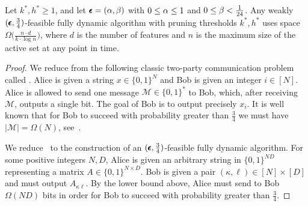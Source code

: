 \begin{theorem}\label{thm:lb}
Let $k^*, h^* \ge 1$, and let $\pmb{\epsilon}=(\alpha,\beta)$ with $0 \le \alpha \le 1$ and $0 \le \beta < \frac1{24}$. Any weakly $(\pmb{\epsilon},\frac34)$-feasible fully dynamic algorithm with pruning thresholds $k^*, h^*$ uses space $\Omega \big( \frac{n \cdot d} {k \cdot \log n} \big)$, where $d$ is the number of features and $n$ is the maximum size of the active set at any point in time. 
\end{theorem}

\begin{proof}
We reduce from the following classic two-party communication problem called \ind. %
%
Alice is given a string $x \in \{0,1\}^N$ and Bob is given an integer $i \in [N]$. Alice is allowed to send one message $\mathcal{M} \in \{0,1\}^*$ to Bob, which, after receiving $\mathcal M$, outputs a single bit. The goal of Bob is to output precisely $x_i$. It is well known that for Bob to succeed with probability greater than $\frac34$ we must have $|\mathcal{M}|=\Omega(N)$, see~\cite{Henzinger2020_FullyDynamicCoresets}.

We reduce \ind\ to the construction of an $(\pmb{\epsilon},\frac34)$-feasible fully dynamic algorithm. For some positive integers $N,D$, Alice is given an arbitrary string in $\{0,1\}^{ND}$ representing a matrix $A \in \{0,1\}^{N \times D}$. Bob is given a pair $(\kappa,\ell) \in [N] \times [D]$ and must output $A_{\kappa\ell}$. By the lower bound above, Alice must send to Bob $\Omega(ND)$ bits in order for Bob to succeed with probability greater than $\frac34$. 


\end{proof}
